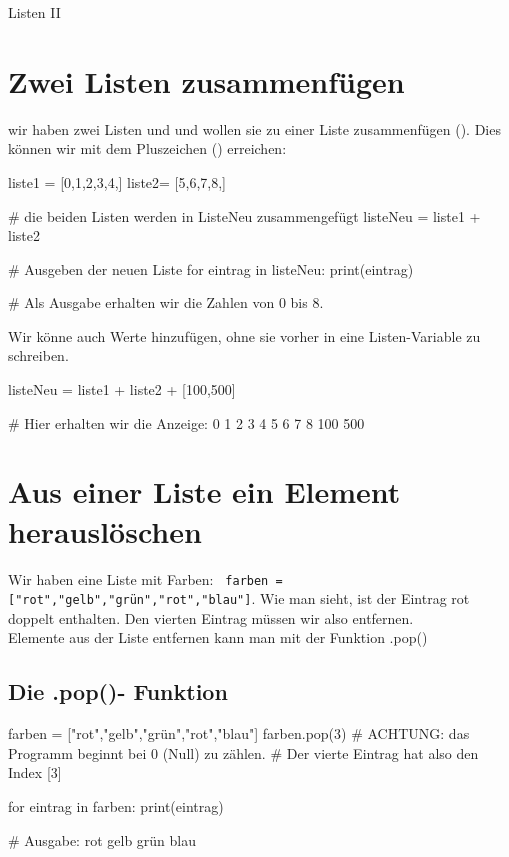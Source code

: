 \documentclass{\VorlagenPfad/coderdojokatext}
\newcommand{\Titel}{Listen II}
\begin{document}
	
\begin{center}
	{\huge \Titel}
\end{center}


\section{Zwei Listen zusammenfügen}
wir haben zwei Listen  und  und wollen sie zu einer Liste zusammenfügen (). Dies können wir mit dem Pluszeichen (\code{+}) erreichen:

\begin{pythoncode}
liste1 = [0,1,2,3,4,]
liste2= [5,6,7,8,]

# die beiden Listen werden in ListeNeu zusammengefügt
listeNeu = liste1 + liste2    	

# Ausgeben der neuen Liste
for eintrag in listeNeu:	
	print(eintrag)
	
# Als Ausgabe erhalten wir die Zahlen von 0 bis 8.	
\end{pythoncode}

Wir könne auch Werte hinzufügen, ohne sie vorher in eine Listen-Variable zu schreiben.

\begin{pythoncode}
listeNeu = liste1 + liste2  + [100,500]    

# Hier erhalten wir die Anzeige: 0 1 2 3 4 5 6 7 8 100 500
\end{pythoncode}




\section{Aus einer Liste ein Element herauslöschen}

Wir haben eine Liste mit Farben:  \texttt{ farben = ["rot","gelb","grün","rot","blau"]}.
Wie man sieht, ist der Eintrag rot doppelt enthalten. Den vierten Eintrag müssen wir also entfernen.
\\ 
Elemente aus der Liste entfernen kann man mit der Funktion .pop()

\subsection{Die .pop()- Funktion}

\begin{pythoncode}
farben = ["rot","gelb","grün","rot","blau"]    
farben.pop(3)	
# ACHTUNG: das Programm beginnt bei 0 (Null) zu zählen. 
# Der vierte Eintrag hat also den Index [3] 

for eintrag in farben:
	print(eintrag)

# Ausgabe: rot gelb grün blau	
\end{pythoncode}
\end{document}
